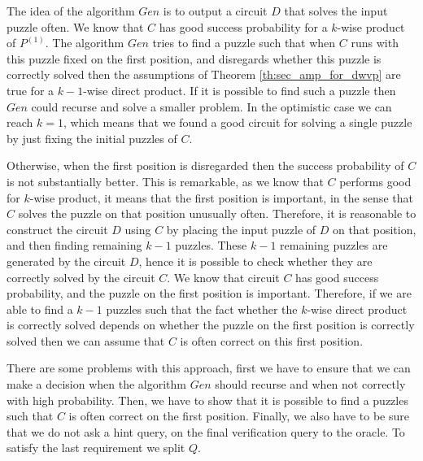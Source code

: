 The idea of the algorithm $Gen$ is to output a circuit $D$ that solves the input puzzle often.
We know that $C$ has good success probability for a $k$-wise product of $P^{(1)}$.
The algorithm $Gen$ tries to find a puzzle such that when $C$ runs with this puzzle fixed
on the first position, and disregards whether this puzzle is correctly solved
then the assumptions of Theorem \ref{th:sec_amp_for_dwvp} are true for a $k-1$-wise direct product.
If it is possible to find such a puzzle then $Gen$ could recurse and solve a smaller problem.
In the optimistic case we can reach $k=1$, which means that we found a good circuit for solving a single
puzzle by just fixing the initial puzzles of $C$.

Otherwise, when the first position is disregarded then the success probability of $C$ is not substantially better.
This is remarkable, as we know that $C$ performs good for $k$-wise product, it means that the first position is important,
in the sense that $C$ solves the puzzle on that position unusually often.
Therefore, it is reasonable to construct the circuit $D$ using $C$ by placing the input puzzle of $D$ on that position, and then
finding remaining $k-1$ puzzles. These $k-1$ remaining puzzles are generated by the circuit $D$, hence it is possible to check
whether they are correctly solved by the circuit $C$. We know that circuit $C$ has good success probability, and the puzzle on the first
position is important. Therefore, if we are able to find a $k-1$ puzzles such that the fact whether the $k$-wise direct product is correctly
solved depends on whether the puzzle on the first position is correctly solved then we can assume that $C$ is often correct on this first position.

There are some problems with this approach, first we have to ensure that we can make a decision when the algorithm $Gen$ should recurse and when not
correctly with high probability. Then, we have to show that it is possible to find a puzzles such that $C$ is often correct on the first position.
Finally, we also have to be sure that we do not ask a hint query, on the final verification query to the oracle.
To satisfy the last requirement we split $Q$.

